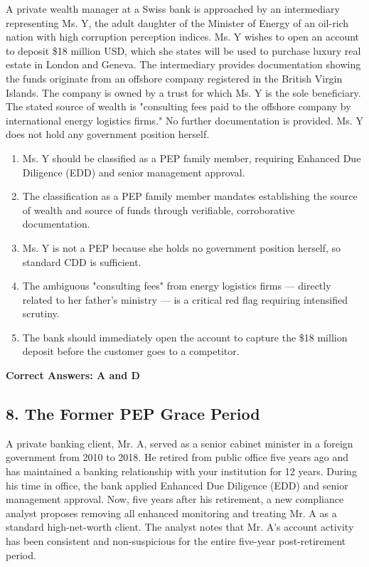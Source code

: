 \documentclass[11pt,a4paper]{article}
\begin{document}
	A private wealth manager at a Swiss bank is approached by an intermediary representing Ms. Y, the adult daughter of the Minister of Energy of an oil-rich nation with high corruption perception indices. Ms. Y wishes to open an account to deposit \$18 million USD, which she states will be used to purchase luxury real estate in London and Geneva. The intermediary provides documentation showing the funds originate from an offshore company registered in the British Virgin Islands. The company is owned by a trust for which Ms. Y is the sole beneficiary. The stated source of wealth is "consulting fees paid to the offshore company by international energy logistics firms." No further documentation is provided. Ms. Y does not hold any government position herself.
	
	\begin{enumerate}[label=\Alph*.]
		\item Ms. Y should be classified as a PEP family member, requiring Enhanced Due Diligence (EDD) and senior management approval.
		\item The classification as a PEP family member mandates establishing the source of wealth and source of funds through verifiable, corroborative documentation.
		\item Ms. Y is not a PEP because she holds no government position herself, so standard CDD is sufficient.
		\item The ambiguous "consulting fees" from energy logistics firms — directly related to her father's ministry — is a critical red flag requiring intensified scrutiny.
		\item The bank should immediately open the account to capture the \$18 million deposit before the customer goes to a competitor.
	\end{enumerate}
	
	\textbf{Correct Answers: A and D}
	
	\subsection{8. The Former PEP Grace Period}
	
	A private banking client, Mr. A, served as a senior cabinet minister in a foreign government from 2010 to 2018. He retired from public office five years ago and has maintained a banking relationship with your institution for 12 years. During his time in office, the bank applied Enhanced Due Diligence (EDD) and senior management approval. Now, five years after his retirement, a new compliance analyst proposes removing all enhanced monitoring and treating Mr. A as a standard high-net-worth client. The analyst notes that Mr. A's account activity has been consistent and non-suspicious for the entire five-year post-retirement period.
	
\end{document}
